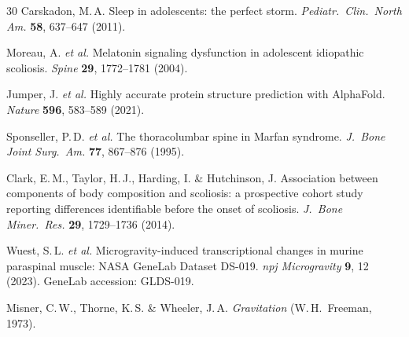 \documentclass[12pt]{article}
\begin{document}
\begin{thebibliography}{30}
Carskadon, M.\,A. Sleep in adolescents: the perfect storm. \textit{Pediatr.\ Clin.\ North Am.} \textbf{58}, 637--647 (2011).

Moreau, A. \textit{et al.} Melatonin signaling dysfunction in adolescent idiopathic scoliosis. \textit{Spine} \textbf{29}, 1772--1781 (2004).

Jumper, J. \textit{et al.} Highly accurate protein structure prediction with AlphaFold. \textit{Nature} \textbf{596}, 583--589 (2021).

Sponseller, P.\,D. \textit{et al.} The thoracolumbar spine in Marfan syndrome. \textit{J.\ Bone Joint Surg.\ Am.} \textbf{77}, 867--876 (1995).

Clark, E.\,M., Taylor, H.\,J., Harding, I. \& Hutchinson, J. Association between components of body composition and scoliosis: a prospective cohort study reporting differences identifiable before the onset of scoliosis. \textit{J.\ Bone Miner.\ Res.} \textbf{29}, 1729--1736 (2014).

Wuest, S.\,L. \textit{et al.} Microgravity-induced transcriptional changes in murine paraspinal muscle: NASA GeneLab Dataset DS-019. \textit{npj Microgravity} \textbf{9}, 12 (2023). GeneLab accession: GLDS-019.

Misner, C.\,W., Thorne, K.\,S. \& Wheeler, J.\,A. \textit{Gravitation} (W.\,H.\ Freeman, 1973).

\end{thebibliography}
\end{document}
